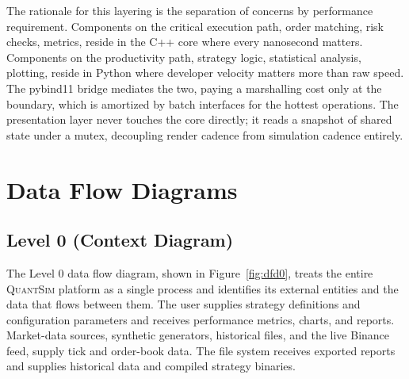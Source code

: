 \documentclass[12pt,oneside,a4paper]{report}
\newcommand{\quantsim}{\textsc{QuantSim}}
\begin{document}
The rationale for this layering is the separation of concerns by performance requirement. Components on the critical execution path, order matching, risk checks, metrics, reside in the C++ core where every nanosecond matters. Components on the productivity path, strategy logic, statistical analysis, plotting, reside in Python where developer velocity matters more than raw speed. The pybind11 bridge mediates the two, paying a marshalling cost only at the boundary, which is amortized by batch interfaces for the hottest operations. The presentation layer never touches the core directly; it reads a snapshot of shared state under a mutex, decoupling render cadence from simulation cadence entirely.

\section{Data Flow Diagrams}
\label{sec:dfd}

\subsection{Level 0 (Context Diagram)}

The Level 0 data flow diagram, shown in Figure~\ref{fig:dfd0}, treats the entire \quantsim{} platform as a single process and identifies its external entities and the data that flows between them. The user supplies strategy definitions and configuration parameters and receives performance metrics, charts, and reports. Market-data sources, synthetic generators, historical files, and the live Binance feed, supply tick and order-book data. The file system receives exported reports and supplies historical data and compiled strategy binaries.
\end{document}
